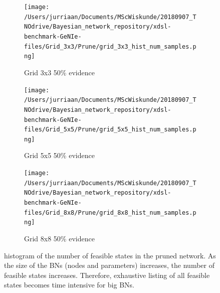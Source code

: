 \documentclass[a4paper, twoside, 11pt]{report}
\theoremstyle{plain}
\theoremstyle{definition}
\theoremstyle{remark}
\begin{document}
\begin{figure}[h!]
\begin{subfigure}{.33\linewidth}
\texttt{[image: /Users/jurriaan/Documents/MScWiskunde/20180907\_TNOdrive/Bayesian\_network\_repository/xdsl-benchmark-GeNIe-files/Grid\_3x3/Prune/grid\_3x3\_hist\_num\_samples.png]}
\caption{Grid 3x3 50\% evidence}%
\label{grid_3x3}%
\end{subfigure}\hfill%
\begin{subfigure}{.33\linewidth}
\texttt{[image: /Users/jurriaan/Documents/MScWiskunde/20180907\_TNOdrive/Bayesian\_network\_repository/xdsl-benchmark-GeNIe-files/Grid\_5x5/Prune/grid\_5x5\_hist\_num\_samples.png]}
\caption{Grid 5x5 50\% evidence}%
\label{grid_5x5}%
\end{subfigure}\hfill%
\begin{subfigure}{.33\linewidth}
\texttt{[image: /Users/jurriaan/Documents/MScWiskunde/20180907\_TNOdrive/Bayesian\_network\_repository/xdsl-benchmark-GeNIe-files/Grid\_8x8/Prune/grid\_8x8\_hist\_num\_samples.png]}
\caption{Grid 8x8 50\% evidence}%
\label{grid_8x8}%
\end{subfigure}\hfill%

\vspace{0.75pc}
\caption{histogram of the number of feasible states in the pruned network. As the size of the BNs (nodes and parameters) increases, the number of feasible states increases. Therefore, exhaustive listing of all feasible states becomes time intensive for big BNs.}
\label{results1}
\end{figure}
\end{document}
